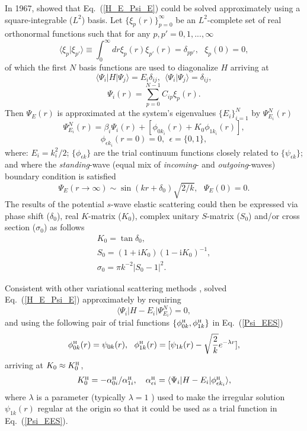 \documentclass[aip
, pra
, showpacs
, aps
, twocolumn
, groupedaddress
, floatfix
]{revtex4}
\newcommand{\beq}{\begin{equation}}
\newcommand{\eeq}{\end{equation}}
\newcommand{\barr}{\begin{array}}
\newcommand{\earr}{\end{array}}
\newcommand{\phiH}{\phi^{\mbox{\tiny{H}}}}
\begin{document}
In 1967, \citet{Harris67} showed that Eq.~(\ref{H_E_Psi_E}) could be solved
approximately using a square-integrable ($L^2$) basis.
Let $\{\xi_p(r)\}_{p=0}^\infty$ be an $L^2$-complete set of real orthonormal functions
such that for any $p,p'=0,1,...,\infty$
\beq
\langle \xi_p | \xi_{p'} \rangle \equiv \int_0^\infty dr \xi_p(r) \xi_{p'}(r) =\delta_{pp'}, \ \ \ \xi_p(0)=0,
\eeq
of which the first $N$ basis functions are used to diagonalize $H$ arriving at
\beq
\langle \Psi_i |H| \Psi_j \rangle = E_i \delta_{ij} , \ \ \langle \Psi_i | \Psi_j \rangle=\delta_{ij},
\eeq
\beq
\Psi_i(r) = \sum_{p=0}^{N-1} C_{ip} \xi_p(r).
\eeq
Then $\Psi_E(r)$ is approximated at the system's eigenvalues $\{E_i\}_{i=1}^{N}$ by $\Psi^N_{E_i}(r)$
\cite{Harris67}
\beq
\Psi^N_{E_i}(r) = \beta_i \Psi_i(r)  + [\phi_{0k_i}(r)  + K_{0} \phi_{1k_i}(r)],
\label{Psi_EES} \eeq
\beq
\phi_{\epsilon k_i}(r=0) = 0, \ \ \epsilon = \{0,1\},
\eeq
where: $E_i=k_i^2/2$; $\{\phi_{\epsilon k}\}$ are the trial continuum functions closely related to $\{\psi_{\epsilon k}\}$; and where the {\em standing}-wave (equal mix of {\em incoming}- and {\em outgoing}-waves) boundary condition is satisfied
\beq
\Psi_E(r \rightarrow \infty) \sim  \sin(kr+\delta_0) \sqrt{2/k}, \ \ \ \Psi_E(0)=0.   \label{stand_wave}
\eeq
The results of the potential $s$-wave elastic scattering could then be expressed via
phase shift ($\delta_0$), real $K$-matrix ($K_0$), complex unitary $S$-matrix ($S_{0}$) and/or cross section ($\sigma_{0}$)
as follows
\beq \barr{l}
K_{0} = \tan{\delta_0},\\
S_{0}=(1+\mbox{i}K_0)(1-\mbox{i}K_0)^{-1}, \\
\sigma_{0}=\pi k^{-2} |S_{0}-1|^2.
\earr \eeq


Consistent with other variational scattering methods \cite{Nesbet68},
\citet{Harris67} solved Eq.~(\ref{H_E_Psi_E}) approximately by requiring
\beq
\langle\Psi_i|H-E_i|\Psi^N_{E_i}\rangle=0,  \label{EES_ONE_C1}
\eeq
and using the following pair of trial functions $\{\phiH_{0k}, \phiH_{1k} \}$ in
Eq.~(\ref{Psi_EES})
\beq
\phiH_{0k}(r) =  \psi_{0k}(r),\ \
\phiH_{1k}(r) =  [\psi_{1k}(r) - \sqrt{\frac{2}{k}} e^{-\lambda r}],
\label{def_phi_H} \eeq
arriving at $K_0\approx K^{\mbox{\tiny{H}}}_{0}$,
\beq \barr{l}
K^{\mbox{\tiny{H}}}_{0} = - \alpha^{\mbox{\tiny{H}}}_{0i} / \alpha^{\mbox{\tiny{H}}}_{1i}, \ \ \
\alpha^{\mbox{\tiny{H}}}_{\epsilon i} = \langle\Psi_i|H-E_i|  \phiH_{\epsilon k_i} \rangle,
\earr \label{K_0_Harris} \eeq
where $\lambda$ is a parameter (typically $\lambda=1$ \cite{Nesbet68}) used to make the irregular solution $\psi_{1k}(r)$ regular
at the origin so that it could be used as a trial function in Eq.~(\ref{Psi_EES}).
\end{document}
